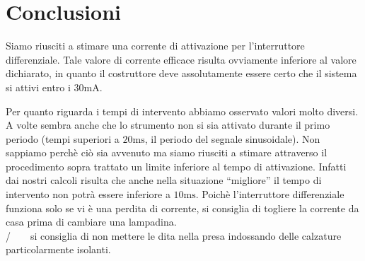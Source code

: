 \section{Conclusioni}
Siamo riusciti a stimare una corrente di attivazione per l'interruttore differenziale. Tale valore di corrente efficace risulta ovviamente inferiore al valore dichiarato, in quanto il costruttore deve assolutamente essere certo che il sistema si attivi entro i $30\si{\milli\ampere}$.

Per quanto riguarda i tempi di intervento abbiamo osservato valori molto diversi. A volte sembra anche che lo strumento non si sia attivato durante il primo periodo (tempi superiori a $20\si{\milli\second}$, il periodo del segnale sinusoidale). Non sappiamo perchè ciò sia avvenuto ma siamo riusciti a stimare attraverso il procedimento sopra trattato un limite inferiore al tempo di attivazione. Infatti dai nostri calcoli risulta che anche nella situazione ``migliore'' il tempo di intervento non potrà essere inferiore a $10\si{\milli\second}$. Poichè l'interruttore differenziale funziona solo se vi è una perdita di corrente, si consiglia di togliere la corrente da casa prima di cambiare una lampadina.\\

/$\quad\,\,\,\,$ si consiglia di non mettere le dita nella presa indossando delle calzature particolarmente isolanti.
